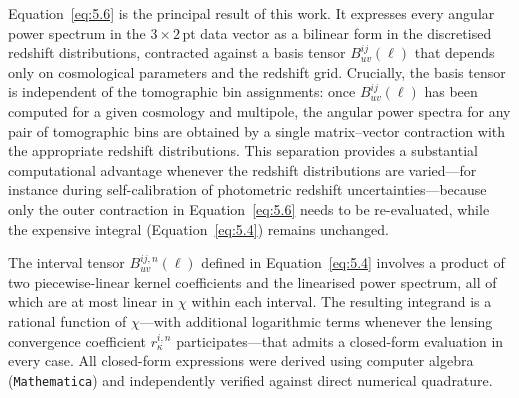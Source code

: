 Equation~\ref{eq:5.6} is the principal result of this work. It expresses every angular power spectrum in the \(3\times2\,\mathrm{pt}\) data vector as a bilinear form in the discretised redshift distributions, contracted against a basis tensor \(B_{uv}^{ij}(\ell)\) that depends only on cosmological parameters and the redshift grid. Crucially, the basis tensor is independent of the tomographic bin assignments: once \(B_{uv}^{ij}(\ell)\) has been computed for a given cosmology and multipole, the angular power spectra for any pair of tomographic bins are obtained by a single matrix--vector contraction with the appropriate redshift distributions. This separation provides a substantial computational advantage whenever the redshift distributions are varied---for instance during self-calibration of photometric redshift uncertainties---because only the outer contraction in Equation~\ref{eq:5.6} needs to be re-evaluated, while the expensive integral (Equation~\ref{eq:5.4}) remains unchanged.

The interval tensor \(B_{uv}^{ij,n}(\ell)\) defined in Equation~\ref{eq:5.4} involves a product of two piecewise-linear kernel coefficients and the linearised power spectrum, all of which are at most linear in \(\chi\) within each interval. The resulting integrand is a rational function of \(\chi\)---with additional logarithmic terms whenever the lensing convergence coefficient \(r_\kappa^{i,n}\) participates---that admits a closed-form evaluation in every case. All closed-form expressions were derived using computer algebra (\texttt{Mathematica}) and independently verified against direct numerical quadrature.

